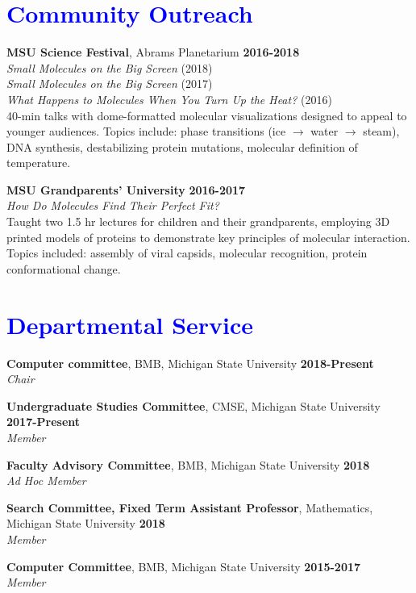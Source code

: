 \documentclass[margin,line]{res}
\begin{document}
\begin{resume}
\section{\sc \textcolor{blue}{Community Outreach}}
        {\bf MSU Science Festival}, Abrams Planetarium \hfill {\bf 2016-2018} \\
        \emph{Small Molecules on the Big Screen} (2018)\\
        \emph{Small Molecules on the Big Screen} (2017)\\
        \emph{What Happens to Molecules When You Turn Up the Heat?} (2016)\\
        40-min talks with dome-formatted molecular visualizations designed to appeal to younger audiences.  Topics include: phase transitions (ice $\rightarrow$ water $\rightarrow$ steam), DNA synthesis, destabilizing protein mutations, molecular definition of temperature.

        {\bf MSU Grandparents' University} \hfill {\bf 2016-2017} \\
        \emph{How Do Molecules Find Their Perfect Fit?}\\
        Taught two 1.5 hr lectures for children and their grandparents, employing 3D printed models of proteins to demonstrate key principles of molecular interaction.  Topics included: assembly of viral capsids, molecular recognition, protein conformational change.

\section{\sc \textcolor{blue}{ Departmental Service}}
        
        {\bf Computer committee}, BMB, Michigan State University \hfill {\bf 2018-Present}\\
        {\emph {Chair}}

        {\bf Undergraduate Studies Committee}, CMSE, Michigan State University \hfill {\bf 2017-Present}\\
        {\emph {Member}}

        {\bf Faculty Advisory Committee}, BMB, Michigan State University \hfill {\bf 2018}\\
        {\emph {Ad Hoc Member}}

        {\bf Search Committee, Fixed Term Assistant Professor}, Mathematics, Michigan State University \hfill {\bf 2018}\\
        {\emph {Member}}
        
        {\bf Computer Committee}, BMB, Michigan State University \hfill {\bf 2015-2017}\\
        {\emph {Member}}


\end{resume}
\end{document}
